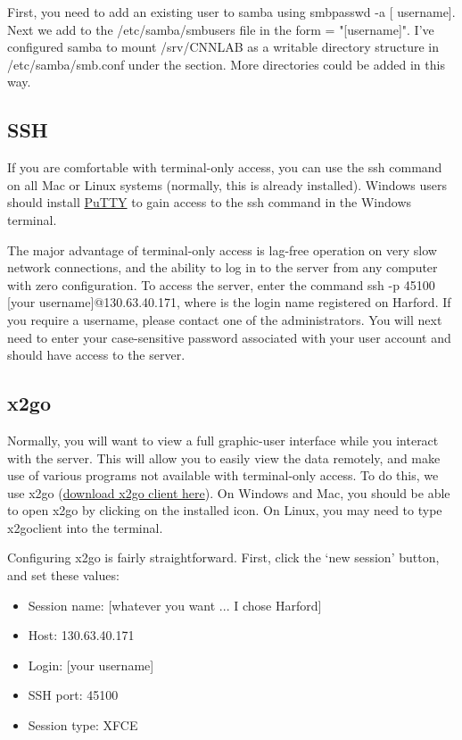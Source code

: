 \documentclass[final,titlepage,letterpaper,oneside,12pt]{article}
\renewcommand{\texttt}[2][BrickRed]{\textcolor{#1}{\ttfamily #2}}%
\begin{document}
First, you need to add an existing user to samba using \texttt{smbpasswd -a [
username]}. Next we add \texttt{[username]}  to the \texttt{/etc/samba/smbusers} file in the form \texttt{[username] = "[username]"}. I've configured samba to mount \texttt{/srv/CNNLAB} as a writable directory structure in \texttt{/etc/samba/smb.conf} under the \texttt{[CNNLAB]} section. More directories could be added in this way. 

\subsection{SSH}

If you are comfortable with terminal-only access, you can use the \texttt{ssh} command on all Mac or Linux systems (normally, this is already installed). Windows users should install \href{http://www.chiark.greenend.org.uk/~sgtatham/putty/}{PuTTY} to gain access to the \texttt{ssh} command in the Windows terminal.

The major advantage of terminal-only access is lag-free operation on very slow network connections, and the ability to log in to the server from any computer with zero configuration. To access the server, enter the command \texttt{ssh -p 45100 [your username]@130.63.40.171}, where \texttt{[your username]} is the login name registered on Harford. If you require a username, please contact one of the administrators. You will next need to enter your case-sensitive password associated with your user account and should have access to the server.

\subsection{x2go}

Normally, you will want to view a full graphic-user interface while you interact with the server. This will allow you to easily view the data remotely, and make use of various programs not available with terminal-only access. To do this, we use x2go (\href{http://wiki.x2go.org/doku.php}{download x2go client here}). On Windows and Mac, you should be able to open x2go by clicking on the installed icon. On Linux, you may need to type \texttt{x2goclient} into the terminal.

Configuring x2go is fairly straightforward. First, click the `new session' button, and set these values:

\begin{itemize} \itemsep-2pt
    \item{Session name: [whatever you want ... I chose Harford]}
    \item{Host: 130.63.40.171}
    \item{Login: [your username]}
    \item{SSH port: 45100}
    \item{Session type: XFCE}
\end{itemize}
\end{document}
